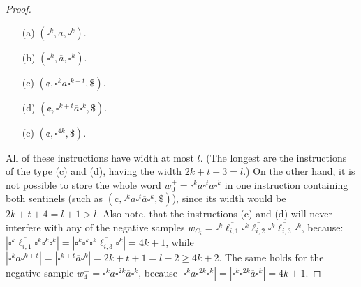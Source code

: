 \begin{proof}
\begin{enumerate}
\item[(a)] $(\square^k, a, \square^k)$.
\item[(b)] $(\square^k, \overline{a}, \square^k)$.
\item[(c)] $(\cent, \square^k a \square^{k+t}, \$)$.
\item[(d)] $(\cent, \square^{k+t} \overline{a} \square^k, \$)$.
\item[(e)] $(\cent, \square^{4k}, \$)$.
\end{enumerate}
All of these instructions have width at most $l$. (The longest are the instructions of the type (c) and (d), having the width $2k + t + 3 = l$.) On the other hand, it is not possible to store the whole word $w_0^+ = \square^k a \square^t \overline{a} \square^k$ in one instruction containing both sentinels (such as $(\cent, \square^k a \square^t \overline{a} \square^k, \$)$), since its width would be $2k + t + 4 = l + 1 > l$. Also note, that the instructions (c) and (d) will never interfere with any of the negative samples $w_{C_i}^- = \square^k \overline{\ell_{i,1}} \square^k \overline{\ell_{i,2}} \square^k \overline{\ell_{i,3}} \square^k$, because: $|\square^k \overline{\ell_{i,1}} \square^k \square^k \square^k| = |\square^k \square^k \square^k \overline{\ell_{i,3}} \square^k| = 4k + 1$, while $|\square^k a \square^{k+t}| = |\square^{k+t} \overline{a} \square^k| = 2k + t + 1 = l - 2 \ge 4k + 2$. The same holds for the negative sample $w_4^- = \square^k a \square^{2k}  \overline{a} \square^k$, because $|\square^k a \square^{2k} \square^k| = |\square^k \square^{2k}  \overline{a} \square^k| = 4k + 1$.


\end{proof}
